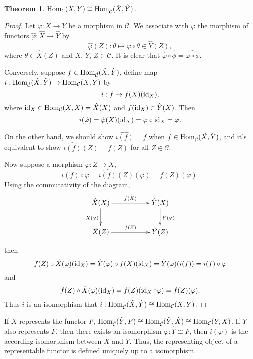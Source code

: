 \documentclass[9pt]{extarticle}
\theoremstyle{plain}
\newtheorem{theo}{Theorem}
\newcommand{\cc}{\mathcal{C}}
\begin{document}
\begin{theo}
$\Hom_\cc (X,Y)\cong \Hom_{\hat{\cc}} (\hat{X},\hat{Y})$.
\end{theo}
\begin{proof}
	Let $\varphi:X\to Y$ be a morphism in $\cc$. We associate with $\varphi$ the morphism of functors $\hat{\varphi}:\hat{X}\to \hat{Y}$ by
	\[
		\hat{\varphi}(Z):\theta\mapsto\varphi\circ\theta\in \hat{Y}(Z),
	\]
	where $\theta\in \hat{X}(Z)$ and $X$, $Y$, $Z\in \cc$. It is clear that $\hat{\varphi}\circ \hat{\phi}=\widehat{\varphi\circ\phi}$.

	Conversely, suppose $f\in \Hom_{\hat{\cc}} (\hat{X},\hat{Y})$, define map $i:\Hom_{\hat{\cc}} (\hat{X},\hat{Y})\to \Hom_\cc (X,Y)$ by 
	\[
		i:f\mapsto f(X)(\operatorname{id}_X),
	\]
	where $\id_X\in \Hom_\cc(X,X)=\hat{X}(X)$ and $f(\operatorname{id}_X)\in \hat{Y}(X)$. Then 
	\[
		i(\hat{\varphi})=\hat{\varphi}(X)(\operatorname{id}_X)=\varphi\circ \operatorname{id}_X=\varphi.
	\]

	On the other hand, we should show $\widehat{i(f)}=f$ when $f\in \Hom_{\hat{\cc}} (\hat{X},\hat{Y})$, and it's equivalent to show $\widehat{i(f)}(Z)=f(Z)$ for all $Z\in\cc$.

	Now suppose a morphism $\varphi:Z\to X$,
	\[
		i(f)\circ\varphi=\widehat{i(f)}(Z)(\varphi)=f(Z)(\varphi).
	\]
	Using the commutativity of the diagram,
	\[
	\begin{xy}
		\xymatrix{
			\hat{X}(X)\ar[rr]^{f(X)} \ar[d]_{\hat{X}(\varphi)}&&\hat{Y}(X) \ar[d]^{\hat{Y}(\varphi)}\\
			\hat{X}(Z)\ar[rr]^{f(Z)}&&\hat{Y}(Z)
		}
	\end{xy}
	\]

	\noindent then
	\[
		f(Z)\circ\hat{X}(\varphi)(\operatorname{id}_X)=\hat{Y}(\varphi)\circ f(X)(\operatorname{id}_X)=\hat{Y}(\varphi)(i(f))=i(f)\circ \varphi
	\]
	and
	\[
		f(Z)\circ\hat{X}(\varphi)(\operatorname{id}_X)=f(Z)(\operatorname{id}_X\circ\varphi)=f(Z)(\varphi).
	\]
	Thus $i$ is an isomorphism that $i:\Hom_{\hat{\cc}} (\hat{X},\hat{Y})\cong \Hom_\cc (X,Y)$.
\end{proof}

If $X$ represents the functor $F$, $\Hom_{\hat{\cc}}(\hat{Y},F)\cong \Hom_{\hat{\cc}}(\hat{Y},\hat{X})\cong\Hom_\cc(Y,X)$. If $Y$ also represents $F$, then there exists an isomorphism $\varphi:\hat{Y}\cong F$, then $i(\varphi)$ is the according isomorphism between $X$ and $Y$. Thus, the representing object of a representable functor is defined uniquely up to a isomorphism.
\end{document}
